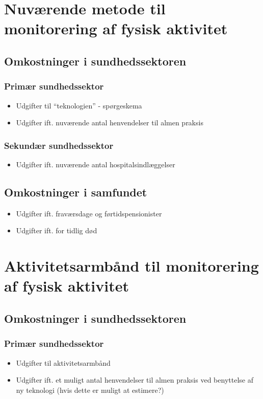 \section{Nuværende metode til monitorering af fysisk aktivitet}
\subsection{Omkostninger i sundhedssektoren}
\subsubsection{Primær sundhedssektor}
\begin{itemize}
\item Udgifter til “teknologien” - spørgeskema
\item Udgifter ift. nuværende antal henvendelser til almen praksis
\end{itemize}
\subsubsection{Sekundær sundhedssektor}
\begin{itemize}
\item Udgifter ift. nuværende antal hospitalsindlæggelser
\end{itemize}
\subsection{Omkostninger i samfundet}
\begin{itemize}
\item Udgifter ift. fraværsdage og førtidspensionister
\item Udgifter ift. for tidlig død
\end{itemize}

\section{Aktivitetsarmbånd til monitorering af fysisk aktivitet}
\subsection{Omkostninger i sundhedssektoren}
\subsubsection{Primær sundhedssektor}
\begin{itemize}
\item  Udgifter til aktivitetsarmbånd
\item Udgifter ift. et muligt antal henvendelser til almen praksis ved benyttelse af ny teknologi (hvis dette er muligt at estimere?)
\end{itemize}
